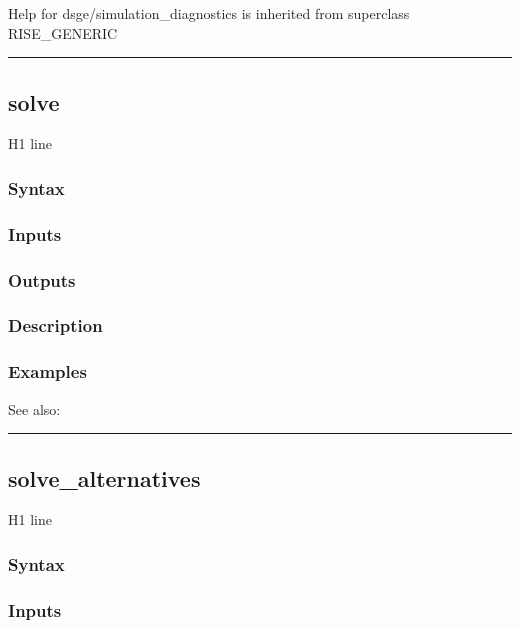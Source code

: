 \documentclass[letterpaper,10pt,english]{sphinxmanual}
\begin{document}
Help for dsge/simulation\_diagnostics is inherited from superclass RISE\_GENERIC


\bigskip\hrule{}\bigskip



\subsection{solve}
\label{classes/models/@dsge/dsge:id181}\label{classes/models/@dsge/dsge:solve}
H1 line


\subsubsection{Syntax}
\label{classes/models/@dsge/dsge:id182}

\subsubsection{Inputs}
\label{classes/models/@dsge/dsge:id183}

\subsubsection{Outputs}
\label{classes/models/@dsge/dsge:id184}

\subsubsection{Description}
\label{classes/models/@dsge/dsge:id185}

\subsubsection{Examples}
\label{classes/models/@dsge/dsge:id186}
See also:


\bigskip\hrule{}\bigskip



\subsection{solve\_alternatives}
\label{classes/models/@dsge/dsge:solve-alternatives}\label{classes/models/@dsge/dsge:id187}
H1 line


\subsubsection{Syntax}
\label{classes/models/@dsge/dsge:id188}

\subsubsection{Inputs}
\label{classes/models/@dsge/dsge:id189}
\end{document}

